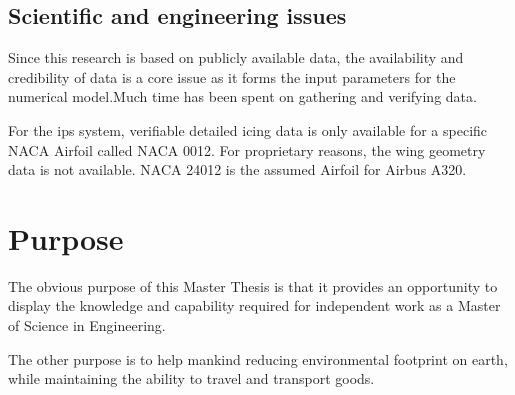 \documentclass[english]{kththesis}
\begin{document}
\subsection{Scientific and engineering issues}
Since this research is based on publicly available data, the availability and credibility of data is a core issue as it forms the input parameters for the numerical model.Much time has been spent on gathering and verifying data.

For the \acrshort{ips} system, verifiable detailed icing data is only available for a specific NACA Airfoil called NACA 0012. For proprietary reasons, the wing geometry data is not available. NACA 24012 is the assumed Airfoil for Airbus A320.

\section{Purpose}
%
%

The obvious purpose of this Master Thesis is that it provides an opportunity to display the knowledge and capability required for independent work as a Master of Science in Engineering.

The other purpose is to help mankind reducing environmental footprint on earth, while maintaining the ability to travel and transport goods.
\end{document}
